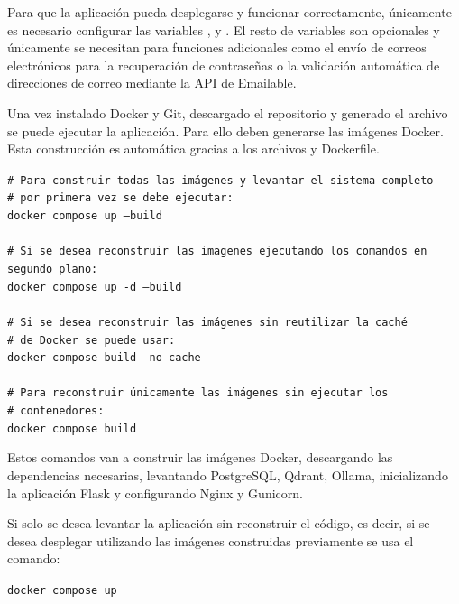 Para que la aplicación pueda desplegarse y funcionar correctamente, únicamente es necesario configurar las variables ,  y . El resto de variables son opcionales y únicamente se necesitan para funciones adicionales como el envío de correos electrónicos para la recuperación de contraseñas o la validación automática de direcciones de correo mediante la API de Emailable.

Una vez instalado Docker y Git, descargado el repositorio y generado el archivo  se puede ejecutar la aplicación. Para ello deben generarse las imágenes Docker. Esta construcción es automática gracias a los archivos  y Dockerfile.

\begin{tcolorbox}[
	colback=black!3,
	colframe=black!30,
	boxrule=0.5pt,
	arc=2mm,
	title= Terminal,
	fonttitle=\bfseries,
	breakable 
]
	{\footnotesize
		\noindent
		\texttt{\# Para construir todas las imágenes y levantar el sistema completo} \\
		\texttt{\# por primera vez se debe ejecutar: }\\
		\texttt{docker compose up --build}\\
		\\
		\texttt{\# Si se desea reconstruir las imagenes ejecutando los comandos en segundo plano:}\\
		\texttt{docker compose up -d --build}\\
		\\
		\texttt{\# Si se desea reconstruir las imágenes sin reutilizar la caché}\\
		\texttt{\# de Docker se puede usar:}\\
		\texttt{docker compose build --no-cache}\\
		\\
		\texttt{\# Para reconstruir únicamente las imágenes sin ejecutar los}\\
		\texttt{\# contenedores:}\\
		\texttt{docker compose build}
	}
\end{tcolorbox}

Estos comandos van a construir las imágenes Docker, descargando las dependencias necesarias, levantando PostgreSQL, Qdrant, Ollama, inicializando la aplicación Flask y configurando Nginx y Gunicorn.

Si solo se desea levantar la aplicación sin reconstruir el código, es decir, si se desea desplegar utilizando las imágenes construidas previamente se usa el comando:
\begin{tcolorbox}[
	colback=black!3,
	colframe=black!30,
	boxrule=0.5pt,
	arc=2mm,
	title= Terminal,
	fonttitle=\bfseries,
	breakable 
]
	{\footnotesize
		\noindent
		\texttt{docker compose up}\\
	}
\end{tcolorbox}

